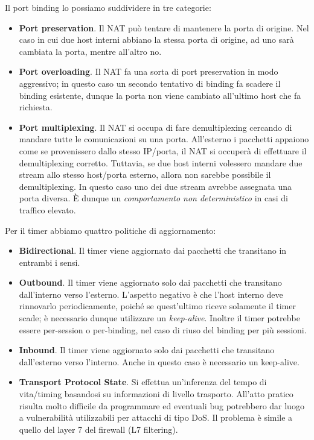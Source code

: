 Il port binding lo possiamo suddividere in tre categorie:
\begin{itemize}
	\item \textbf{Port preservation}. Il NAT può tentare di mantenere la porta di origine. Nel caso in cui due host interni abbiano la stessa porta di origine, ad uno sarà cambiata la porta, mentre all'altro no.
	
	\item \textbf{Port overloading}. Il NAT fa una sorta di port preservation in modo aggressivo; in questo caso un secondo tentativo di binding fa scadere il binding esistente, dunque la porta non viene cambiato all'ultimo host che fa richiesta.
	
	\item \textbf{Port multiplexing}. Il NAT si occupa di fare demultiplexing cercando di mandare tutte le comunicazioni su una porta. All'esterno i pacchetti appaiono come se provenissero dallo stesso IP/porta, il NAT si occuperà di effettuare il demultiplexing corretto. Tuttavia, se due host interni volessero mandare due stream allo stesso host/porta esterno, allora non sarebbe possibile il demultiplexing. In questo caso uno dei due stream avrebbe assegnata una porta diversa. È dunque un \textit{comportamento non deterministico} in casi di traffico elevato.
\end{itemize}
Per il timer abbiamo quattro politiche di aggiornamento:
\begin{itemize}
	\item \textbf{Bidirectional}. Il timer viene aggiornato dai pacchetti che transitano in entrambi i sensi.
	\item \textbf{Outbound}. Il timer viene aggiornato solo dai pacchetti che transitano dall'interno verso l'esterno. L'aspetto negativo è che l'host interno deve rinnovarlo periodicamente, poiché se quest'ultimo riceve solamente il timer scade; è necessario dunque utilizzare un \textit{keep-alive}. Inoltre il timer potrebbe essere per-session o per-binding, nel caso di riuso del binding per più sessioni.
	\item \textbf{Inbound}. Il timer viene aggiornato solo dai pacchetti che transitano dall'esterno verso l'interno. Anche in questo caso è necessario un keep-alive.
	\item \textbf{Transport Protocol State}. Si effettua un'inferenza del tempo di vita/timing basandosi su informazioni di livello trasporto. All'atto pratico risulta molto difficile da programmare ed eventuali bug potrebbero dar luogo a vulnerabilità utilizzabili per attacchi di tipo DoS. Il problema è simile a quello del layer 7 del firewall (L7 filtering).
\end{itemize}
